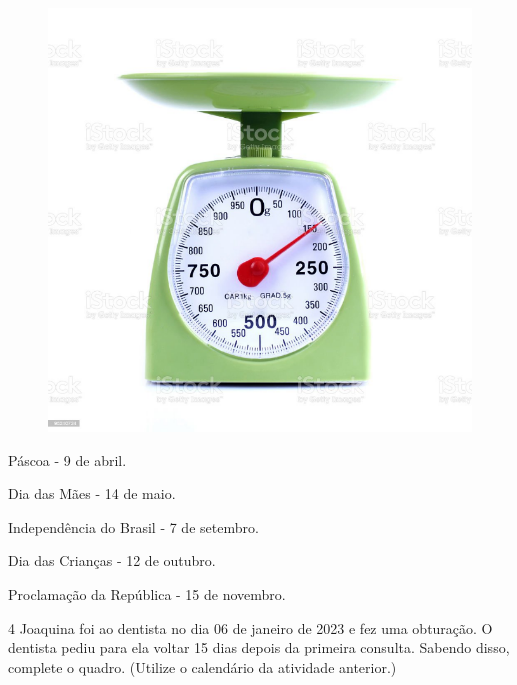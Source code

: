 \begin{figure}[htpb!]
\includegraphics[width=\textwidth]{./media/image52.png}
\end{figure}

\begin{escolha}
\item  Páscoa - 9 de abril.


\item  Dia das Mães - 14 de maio.


\item  Independência do Brasil - 7 de setembro.


\item  Dia das Crianças - 12 de outubro.


\item  Proclamação da República - 15 de novembro.

\end{escolha}

\num{4} Joaquina foi ao dentista no dia 06 de janeiro de 2023 e fez uma
obturação. O dentista pediu para ela voltar 15 dias depois da primeira
consulta. Sabendo disso, complete o quadro. (Utilize o calendário
da atividade anterior.)


